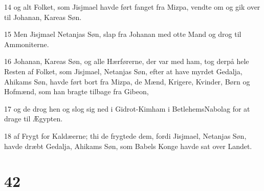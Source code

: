 \par 14 og alt Folket, som Jisjmael havde ført fanget fra Mizpa, vendte om og gik over til Johanan, Kareas Søn.
\par 15 Men Jisjmael Netanjas Søn, slap fra Johanan med otte Mand og drog til Ammoniterne.
\par 16 Johanan, Kareas Søn, og alle Hærførerne, der var med ham, tog derpå hele Resten af Folket, som Jisjmael, Netanjas Søn, efter at have myrdet Gedalja, Ahikams Søn, havde ført bort fra Mizpa, de Mænd, Krigere, Kvinder, Børn og Hofmænd, som han bragte tilbage fra Gibeon,
\par 17 og de drog hen og slog sig ned i Gidrot-Kimham i BetlehemsNabolag for at drage til Ægypten.
\par 18 af Frygt for Kaldæerne; thi de frygtede dem, fordi Jisjmael, Netanjas Søn, havde dræbt Gedalja, Ahikams Søn, som Babels Konge havde sat over Landet.

\chapter{42}

